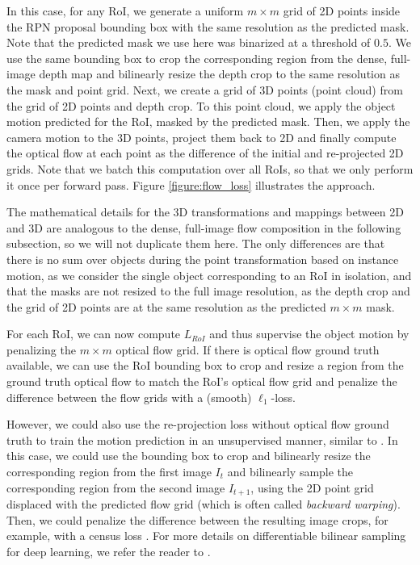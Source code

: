 In this case, for any RoI,
we generate a uniform $m \times m$ grid of 2D points inside the RPN proposal bounding box
with the same resolution as the predicted mask.
Note that the predicted mask we use here was binarized at a threshold of $0.5$.
We use the same bounding box
to crop the corresponding region from the dense, full-image depth map
and bilinearly resize the depth crop to the same resolution as the mask and point
grid.
Next, we create a grid of 3D points (point cloud) from the grid of 2D points and depth crop. To this point cloud, we
apply the object motion predicted for the RoI, masked by the predicted mask.
Then, we apply the camera motion to the 3D points, project them back to 2D
and finally compute the optical flow at each point as the difference of the initial and re-projected 2D grids.
Note that we batch this computation over all RoIs, so that we only perform
it once per forward pass.
Figure \ref{figure:flow_loss} illustrates the approach.

The mathematical details for the 3D transformations and mappings between 2D and 3D are analogous to the
dense, full-image flow composition in the following subsection, so we will not
duplicate them here. The only differences are that there is no sum over objects during
the point transformation based on instance motion, as we consider the single object
corresponding to an RoI in isolation, and that the masks are not resized to the
full image resolution, as
the depth crop and the grid of 2D points are at the same resolution as the predicted
$m \times m$ mask.

For each RoI, we can now compute $L_{RoI}$ and thus supervise the object motion
by penalizing the $m \times m$ optical flow grid.
If there is optical flow ground truth available, we can use the RoI bounding box to
crop and resize a region from the ground truth optical flow to match the RoI's
optical flow grid and penalize the difference between the flow grids with a (smooth) $\ell_1$-loss.

However, we could also use the re-projection loss without optical flow ground truth
to train the motion prediction in an unsupervised manner, similar to \cite{SfmNet}.
In this case, we could use the bounding box to crop and bilinearly resize the corresponding region
from the first image $I_t$ and bilinearly sample the corresponding region from the second image $I_{t+1}$,
using the 2D point grid displaced with the predicted flow grid (which is often called \emph{backward warping}).
Then, we could penalize the difference
between the resulting image crops, for example, with a census loss \cite{CensusTerm,UnFlow}.
For more details on differentiable bilinear sampling for deep learning, we refer the reader to
\cite{STN}.

